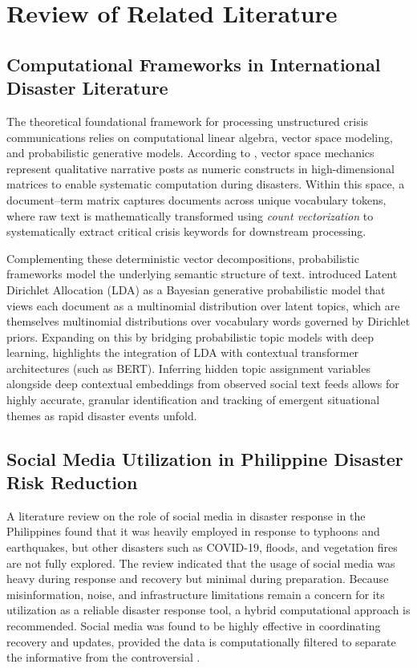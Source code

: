 \section*{Review of Related Literature}

\subsection*{Computational Frameworks in International Disaster Literature}

The theoretical foundational framework for processing unstructured crisis
communications relies on computational linear algebra, vector space modeling,
and probabilistic generative models. According to \textcite{mihunov2022}, vector
space mechanics represent qualitative narrative posts as numeric constructs in
high-dimensional matrices to enable systematic computation during disasters.
Within this space, a document--term matrix captures documents across unique
vocabulary tokens, where raw text is mathematically transformed using \textit{count
vectorization} to systematically extract critical crisis keywords for downstream
processing.

Complementing these deterministic vector decompositions, probabilistic
frameworks model the underlying semantic structure of text. \textcite{blei2003} introduced Latent Dirichlet Allocation (LDA) as a Bayesian
generative probabilistic model that views each document as a multinomial
distribution over latent topics, which are themselves multinomial distributions over vocabulary words governed by Dirichlet priors. Expanding on this by bridging probabilistic topic models with deep learning,
\textcite{zang2026} highlights the integration of LDA with contextual transformer
architectures (such as BERT). Inferring hidden topic assignment variables
alongside deep contextual embeddings from observed social text feeds allows for
highly accurate, granular identification and tracking of emergent situational
themes as rapid disaster events unfold.

\subsection*{Social Media Utilization in Philippine Disaster Risk Reduction}

A literature review on the role of social media in disaster response in the
Philippines found that it was heavily employed in response to typhoons and
earthquakes, but other disasters such as COVID-19, floods, and vegetation
fires are not fully explored. The review indicated that the usage of social
media was heavy during response and recovery but minimal during preparation.
Because misinformation, noise, and infrastructure limitations remain a concern
for its utilization as a reliable disaster response tool, a hybrid
computational approach is recommended. Social media was found to be highly
effective in coordinating recovery and updates, provided the data is
computationally filtered to separate the informative from the controversial
\parencite{inferio2025}.

